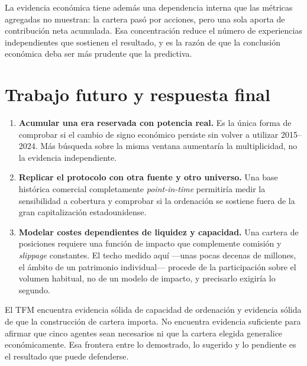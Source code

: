 La evidencia económica tiene además una dependencia interna que las métricas agregadas no muestran:
la cartera pasó por \NumAccionesCartera{} acciones, pero una sola aporta \ContribucionAAPL{} de
contribución neta acumulada. Esa concentración reduce el número de experiencias independientes que
sostienen el resultado, y es la razón de que la conclusión económica deba ser más prudente que la
predictiva.

\section{Trabajo futuro y respuesta final}

\begin{enumerate}[leftmargin=*,itemsep=0.5em]
  \item \textbf{Acumular una era reservada con potencia real.} Es la única forma de comprobar si el
  cambio de signo económico persiste sin volver a utilizar 2015--2024. Más búsqueda sobre la misma
  ventana aumentaría la multiplicidad, no la evidencia independiente.
  \item \textbf{Replicar el protocolo con otra fuente y otro universo.} Una base histórica comercial
  completamente \textit{point-in-time} permitiría medir la sensibilidad a cobertura y comprobar si
  la ordenación se sostiene fuera de la gran capitalización estadounidense.
  \item \textbf{Modelar costes dependientes de liquidez y capacidad.} Una cartera de
  \PosicionesCartera{} posiciones requiere una función de impacto que complemente comisión y
  \textit{slippage} constantes. El techo medido aquí ---unas pocas decenas de millones, el ámbito de
  un patrimonio individual--- procede de la participación sobre el volumen habitual, no de un modelo
  de impacto, y precisarlo exigiría lo segundo.
\end{enumerate}

El TFM encuentra evidencia sólida de capacidad de ordenación y evidencia sólida de que la
construcción de cartera importa. No encuentra evidencia suficiente para afirmar que cinco agentes
sean necesarios ni que la cartera elegida generalice económicamente. Esa frontera entre lo
demostrado, lo sugerido y lo pendiente es el resultado que puede defenderse.
